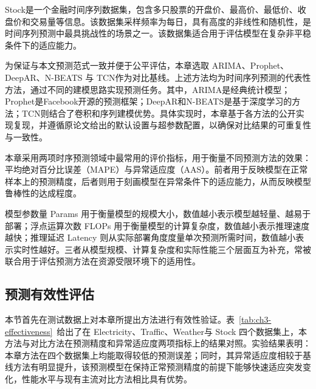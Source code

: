 Stock是一个金融时间序列数据集，包含多只股票的开盘价、最高价、最低价、收盘价和交易量等信息。该数据集采样频率为每日，具有高度的非线性和随机性，是时间序列预测中最具挑战性的场景之一。该数据集适合用于评估模型在复杂非平稳条件下的适应能力。


为保证与本文预测范式一致并便于公平评估，本章选取
ARIMA、Prophet、DeepAR、N-BEATS
与
TCN作为对比基线。上述方法均为时间序列预测的代表性方法，通过不同的建模思路实现预测任务。其中，ARIMA是经典统计模型；Prophet是Facebook开源的预测框架；DeepAR和N-BEATS是基于深度学习的方法；TCN则结合了卷积和序列建模优势。具体实现时，本章基于各方法的公开实现复现，并遵循原论文给出的默认设置与超参数配置，以确保对比结果的可重复性与一致性。


本章采用两项时序预测领域中最常用的评价指标，用于衡量不同预测方法的效果：平均绝对百分比误差（MAPE）与异常适应度（AAS）。前者用于反映模型在正常样本上的预测精度，后者则用于刻画模型在异常条件下的适应能力，从而反映模型鲁棒性的达成程度。

模型参数量 Params 用于衡量模型的规模大小，数值越小表示模型越轻量、越易于部署；浮点运算次数 FLOPs 用于衡量模型的计算复杂度，数值越小表示推理速度越快；推理延迟 Latency 则从实际部署角度度量单次预测所需时间，数值越小表示实时性越好。三者从模型规模、计算复杂度和实际性能三个层面互为补充，常被联合用于评估预测方法在资源受限环境下的适用性。

\FloatBarrier
\subsection{预测有效性评估}\label{ux9884ux6d4bux6709ux6548ux6027ux8bc4ux4f30}

本节首先在测试数据上对本章所提出方法进行有效性验证。表~\ref{tab:ch3-effectiveness}~给出了在
Electricity、Traffic、Weather与 Stock
四个数据集上，本方法与对比方法在预测精度和异常适应度两项指标上的结果对照。实验结果表明：本章方法在四个数据集上均能取得较低的预测误差；同时，其异常适应度相较于基线方法有明显提升，该预测模型在保持正常预测精度的前提下能够快速适应突发变化，性能水平与现有主流对比方法相比具有优势。

